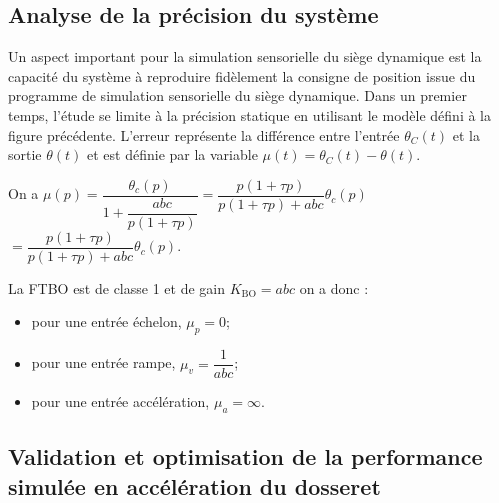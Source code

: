 
\subsection*{Analyse de la précision du système}
\ifprof
\else

Un aspect important pour la simulation sensorielle du siège dynamique
est la capacité du système à reproduire fidèlement la consigne de
position issue du programme de simulation sensorielle du siège
dynamique. Dans un premier temps, l'étude se limite à la précision
statique en utilisant le modèle défini à la figure précédente. L'erreur
représente la différence entre l'entrée $\theta_C(t)$ et la
sortie $\theta(t)$ et est définie par la variable $\mu(t) = \theta_C(t)-\theta(t)$.
\fi



\ifprof
\begin{corrige}
On a $\mu(p)=\dfrac{\theta_c(p)}{1+\dfrac{abc}{p\left( 1+\tau p\right)}}=\dfrac{p\left( 1+\tau p\right)}{p\left( 1+\tau p\right)+abc}\theta_c(p)$ $=\dfrac{p\left( 1+\tau p\right)}{p\left( 1+\tau p\right)+abc}\theta_c(p)$.

La FTBO est de classe 1 et de gain $K_{\text{BO}}={abc}$ on a donc : 
\begin{itemize}
\item pour une entrée échelon, $\mu_p = 0$;
\item pour une entrée rampe, $\mu_v = \dfrac{1}{abc}$;
\item pour une entrée accélération, $\mu_a = \infty$.
\end{itemize}
\end{corrige}
\else
\fi

\subsection*{Validation et optimisation de la performance simulée en
accélération du dosseret}

